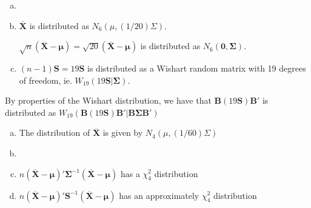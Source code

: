 \documentclass[12pt]{article}\usepackage[]{graphicx}\usepackage[]{color}
\newenvironment{problem}[2][Problem]{\begin{trivlist}
\item[\hskip \labelsep {\bfseries #1}\hskip \labelsep {\bfseries #2.}]}{\end{trivlist}}
\newcommand{\vct}{\mathbf}
\begin{document}

\begin{problem}{4.19}
\end{problem}

\begin{enumerate}[a)]

\item

\item $\overline{\vct{X}}$ is distributed as $N_6(\mu, (1/20)\Sigma)$.

$\sqrt{n}(\overline{\vct{X}} - \vct{\mu}) = \sqrt{20}(\overline{\vct{X}} - \vct{\mu})$ is distributed as $N_6(\vct{0}, \vct{\Sigma})$.

\item $(n-1)\vct{S} = 19\vct{S}$ is distributed as a Wishart random matrix with 19 degrees of freedom, ie. $W_{19}(19\vct{S}|\vct{\Sigma})$.

\end{enumerate}


\begin{problem}{4.20}
\end{problem}

By properties of the Wishart distribution, we have that $\vct{B}(19\vct{S})\vct{B}'$ is distributed as $W_{19}(\vct{B}(19\vct{S})\vct{B}' | \vct{B}\vct{\Sigma}\vct{B}')$


\begin{problem}{4.21}
\end{problem}

\begin{enumerate}[a)]

\item The distribution of $\overline{\vct{X}}$ is given by $N_4(\mu, (1/60)\Sigma)$

\item 

\item $n(\overline{\vct{X}} - \vct{\mu})'\vct{\Sigma}^{-1}(\overline{\vct{X}} - \vct{\mu})$ has a $\chi_4^2$ distribution

\item $n(\overline{\vct{X}} - \vct{\mu})'\vct{\vct{S}}^{-1}(\overline{\vct{X}} - \vct{\mu})$ has an approximately $\chi_4^2$ distribution

\end{enumerate}
\end{document}

